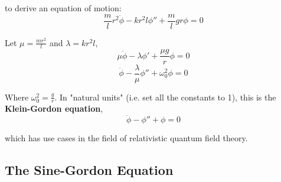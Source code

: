 \documentclass[12pt]{article}
\begin{document}
to derive an equation of motion:
\begin{equation*}
	\frac{m}{l}r^2\ddot{\phi} - kr^2l\phi'' + \frac{m}{l}gr\phi = 0
\end{equation*}

Let $\mu = \frac{mr^2}{l}$ and $\lambda = kr^2l$,
\begin{equation*}
	\mu\ddot{\phi} - \lambda\phi' + \frac{\mu g}{r}\phi = 0
\end{equation*}
\begin{equation}
	\ddot{\phi} - \frac{\lambda}{\mu}\phi'' + \omega_0^2\phi = 0
\end{equation}

Where $\omega_0^2 = \frac{g}{r}$. In "natural units" (i.e. set all the constants to 1), this is the \textbf{Klein-Gordon equation},
\begin{equation}
	\ddot{\phi} - \phi'' + \phi = 0
\end{equation}

which has use cases in the field of relativistic quantum field theory.

\subsection{The Sine-Gordon Equation}
\end{document}
